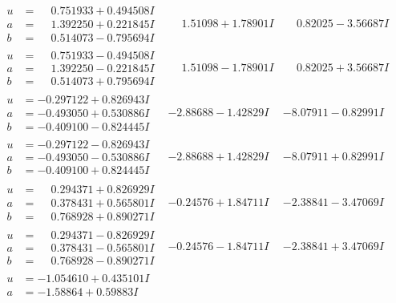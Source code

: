 \documentclass[1p]{elsarticle_modified}
\theoremstyle{definition}
\begin{document}
$$\begin{array}{c|c|c}
 \hline 
\begin{aligned}
u &= \phantom{-}0.751933 + 0.494508 I \\
a &= \phantom{-}1.392250 + 0.221845 I \\
b &= \phantom{-}0.514073 - 0.795694 I\end{aligned}
 & \phantom{-}1.51098 + 1.78901 I & \phantom{-}0.82025 - 3.56687 I \\ \hline\begin{aligned}
u &= \phantom{-}0.751933 - 0.494508 I \\
a &= \phantom{-}1.392250 - 0.221845 I \\
b &= \phantom{-}0.514073 + 0.795694 I\end{aligned}
 & \phantom{-}1.51098 - 1.78901 I & \phantom{-}0.82025 + 3.56687 I \\ \hline\begin{aligned}
u &= -0.297122 + 0.826943 I \\
a &= -0.493050 + 0.530886 I \\
b &= -0.409100 - 0.824445 I\end{aligned}
 & -2.88688 - 1.42829 I & -8.07911 - 0.82991 I \\ \hline\begin{aligned}
u &= -0.297122 - 0.826943 I \\
a &= -0.493050 - 0.530886 I \\
b &= -0.409100 + 0.824445 I\end{aligned}
 & -2.88688 + 1.42829 I & -8.07911 + 0.82991 I \\ \hline\begin{aligned}
u &= \phantom{-}0.294371 + 0.826929 I \\
a &= \phantom{-}0.378431 + 0.565801 I \\
b &= \phantom{-}0.768928 + 0.890271 I\end{aligned}
 & -0.24576 + 1.84711 I & -2.38841 - 3.47069 I \\ \hline\begin{aligned}
u &= \phantom{-}0.294371 - 0.826929 I \\
a &= \phantom{-}0.378431 - 0.565801 I \\
b &= \phantom{-}0.768928 - 0.890271 I\end{aligned}
 & -0.24576 - 1.84711 I & -2.38841 + 3.47069 I \\ \hline\begin{aligned}
u &= -1.054610 + 0.435101 I \\
a &= -1.58864 + 0.59883 I \\

\end{aligned}
\end{array}$$
\end{document}
